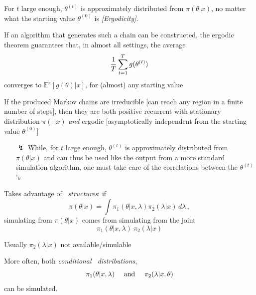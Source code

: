 \begin{slide}
\pause
\begin{block}{}
For $t$ large enough, $\theta^{(t)}$
is approximately distributed from $\pi(\theta|x)$, 
no matter what the starting value $\theta^{(0)}$ is {\em [Ergodicity]}.
\end{block}

\end{slide}\begin{slide}

If an algorithm that generates such a chain can be constructed, the ergodic
theorem guarantees that, in almost all settings, the average
$$
  {1\over T} \sum_{t = 1}^T g(\theta^{(t)})
$$
converges to $\mathbb{E}^\pi[g(\theta)|x]$, for (almost) any starting value

\end{slide}\begin{slide}

If the produced Markov chains are irreducible [can reach any region in a finite number
of steps], then they are both
positive recurrent with stationary distribution $\pi(\cdot|x)$ \emph{and} ergodic [asymptotically independent from the
starting value $\theta^{(0)}$]

\medskip
\begin{enumerate}
\item[{\Large $\lightning$}]
While, for $t$ large enough, $\theta^{(t)}$
is approximately distributed from $\pi(\theta|x)$ and can thus be used
like the output from a more standard simulation algorithm, one must take 
care of the correlations between the $\theta^{(t)}$'s
\end{enumerate}

\end{slide}\begin{slide}

Takes advantage of {\it \hier\ structures}: if
\[
	\pi(\theta|x) = \int \pi_1(\theta|x,\lambda)  \pi_2(\lambda|x) \,d\lambda\,,
\]
simulating from $\pi(\theta|x)$ comes from simulating from the joint \dist\ 
$$
  \pi_1(\theta|x,\lambda)\ \pi_2(\lambda|x)
$$

\end{slide}\begin{slide}

Usually $\pi_2(\lambda|x)$ not available/simulable 

\pause
\vs More often, both {\it conditional \post\ distributions},
$$
\pi_1(\theta|x,\lambda)\quad\hbox{ and }\quad\pi_2(\lambda|x,\theta)
$$
can be simulated.


\end{slide}
